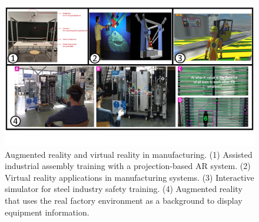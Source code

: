 \documentclass[a4paper,fleqn]{cas-dc}
\begin{document}
\begin{figure}[pos=h]
	\centering
	\includegraphics[width=\textwidth]{Images/imageandvideo2.png}
	\vspace{-4em}
	\caption{Augmented reality and virtual reality in manufacturing. (1) Assisted industrial assembly training with a projection-based AR system. (2) Virtual reality applications in manufacturing systems. (3) Interactive simulator for steel industry safety training. (4) Augmented reality that uses the real factory environment as a background to display equipment information.}
	\label{fig:imageandvideo2}
	\vspace{-2em}
\end{figure}


\end{document}
